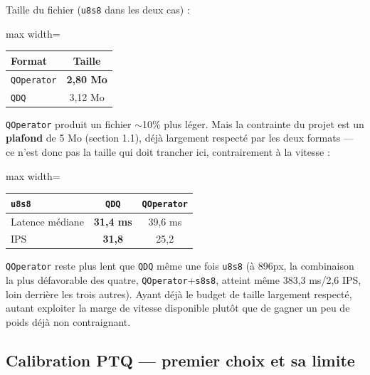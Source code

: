 \documentclass[11pt,a4paper]{article}
\let\Oldsubsection\subsection
\renewcommand{\subsection}{\FloatBarrier\Oldsubsection}
\begin{document}
    Taille du fichier (\texttt{u8s8} dans les deux cas) :
    
    \begin{table}[!htbp]
    \centering
    \small
    \begin{adjustbox}{max width=\linewidth}
    \begin{tabular}{@{}lc@{}}
    \toprule
    \textbf{Format} & \textbf{Taille} \\
    \midrule
    \texttt{QOperator} & \textbf{2,80 Mo} \\
    \texttt{QDQ} & 3,12 Mo \\
    \bottomrule
    \end{tabular}
    \end{adjustbox}
    \end{table}
    
    \texttt{QOperator} produit un fichier $\sim$10\% plus léger. Mais la
    contrainte du projet est un \textbf{plafond} de 5 Mo (section 1.1),
    déjà largement respecté par les deux formats --- ce n'est donc pas la
    taille qui doit trancher ici, contrairement à la vitesse :
    
    \begin{table}[!htbp]
    \centering
    \small
    \begin{adjustbox}{max width=\linewidth}
    \begin{tabular}{@{}lcc@{}}
    \toprule
    \texttt{u8s8} & \texttt{QDQ} & \texttt{QOperator} \\
    \midrule
    Latence médiane & \textbf{31,4 ms} & 39,6 ms \\
    IPS & \textbf{31,8} & 25,2 \\
    \bottomrule
    \end{tabular}
    \end{adjustbox}
    \end{table}
    
    \texttt{QOperator} reste plus lent que \texttt{QDQ} même une fois
    \texttt{u8s8} (à 896px, la combinaison la plus défavorable des
    quatre, \texttt{QOperator}+\texttt{s8s8}, atteint même 383,3 ms/2,6 IPS,
    loin derrière les trois autres). Ayant
    déjà le budget de taille largement respecté, autant exploiter la
    marge de vitesse disponible plutôt que de gagner un peu de poids déjà
    non contraignant.
    
    \subsection{Calibration PTQ --- premier choix et sa limite}
    
\end{document}
